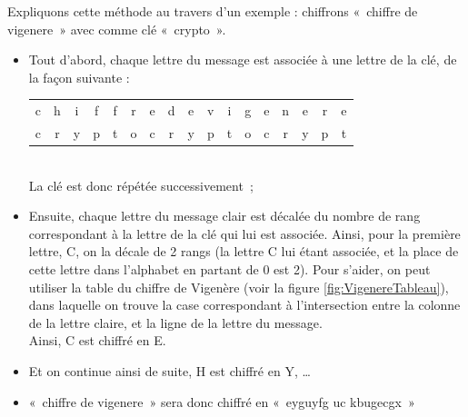 Expliquons cette méthode au travers d'un exemple : chiffrons «~chiffre
de vigenere~» avec comme clé «~crypto~».
\begin{itemize}
  \item Tout d'abord, chaque lettre du message est associée à une
    lettre de la clé, de la façon suivante : \\
    \begin{tabular}{c@{}c@{}c@{}c@{}c@{}c@{}cc@{}cc@{}c@{}c@{}c@{}c@{}c@{}c@{}c}
      c & h & i & f & f & r & e &
      d & e &
      v & i & g & e & n & e & r & e \\

      c & r & y & p & t & o & c & 
      r & y & 
      p & t & o & c & r & y & p & t \\
    \end{tabular}\\
    La clé est donc répétée successivement~;
  \item Ensuite, chaque lettre du message clair est décalée du nombre
    de rang correspondant à la lettre de la clé qui lui est
    associée. Ainsi, pour la première lettre, C, on la décale de 2
    rangs (la lettre C lui étant associée, et la place de cette lettre
    dans l'alphabet en partant de 0 est 2). Pour s'aider, on peut
    utiliser la table du chiffre de Vigenère (voir la figure
    \ref{fig:VigenereTableau}), dans laquelle on trouve la case
correspondant à l'intersection entre la colonne de la lettre
claire, et la ligne de la lettre du message. \\
    Ainsi, C est chiffré en E.
  \item Et on continue ainsi de suite, H est chiffré en Y, \dots
  \item «~chiffre de vigenere~» sera donc chiffré en «~eyguyfg uc
    kbugecgx~»
\end{itemize}


